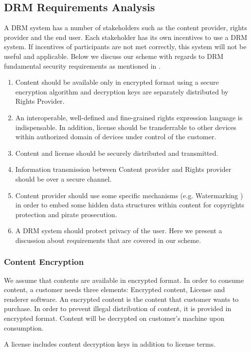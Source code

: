 \documentclass[times]{secauth}
\begin{document}
\subsection{DRM Requirements Analysis}
\label{sec:drm_req}
A DRM system has a number of stakeholders such as the content provider, rights provider and the end user. Each stakeholder has its own incentives to use a DRM system. If incentives of participants are not met correctly, this system will not be useful and applicable. Below we discuss our scheme with regards to DRM fundamental security requirements as mentioned in \cite{N39}. 
\begin{enumerate}
\item Content should be available only in encrypted format using a secure encryption algorithm and decryption keys are separately distributed by Rights Provider.
\item An interoperable, well-defined and fine-grained rights expression language is indispensable. In addition, license should be transferrable to other devices within authorized domain of devices under control of the customer.
\item Content and license should be securely distributed and transmitted.
\item Information transmission between Content provider and Rights provider should be over a secure channel.
\item Content provider should use some specific mechanisms (e.g. Watermarking \cite{N9}) in order to embed some hidden data structures within content for copyrights protection and pirate prosecution.
\item A DRM system should protect privacy of the user.
Here we present a discussion about requirements that are covered in our scheme.
\end{enumerate}

\subsubsection{Content Encryption}
We assume that contents are available in encrypted format. In order to consume content, a customer needs three elements: Encrypted content, License and renderer software.
An encrypted content is the content that customer wants to purchase. In order to prevent illegal distribution of content, it is provided in encrypted format. Content will be decrypted on customer's machine upon consumption.

A license includes content decryption keys in addition to license terms. 
\end{document}
